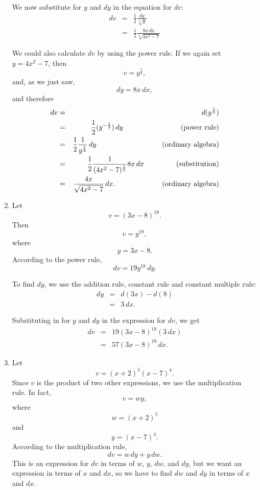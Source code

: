 \documentclass[twoside,openright]{article}
\newlength{\oldjot}
\begin{document}
\begin{enumerate}
We now substitute for $y$ and $dy$ in the equation for $dv$:
\setlength{\jot}{2ex}
\begin{eqnarray*}
dv & = & \frac{1}{2}\frac{dy}{\sqrt[2]{y}}  \\
& = &  \frac{1}{2}\frac{8x\,dx}{\sqrt[2]{4x^2-7}}  
 \end{eqnarray*}
\setlength{\jot}{\oldjot}



We could also calculate $dv$ by using the power rule.  If we again set $y= 4x^2 -7$, then
$$v  =  y^{\frac{1}{2}},$$
and, as we just saw,
$$dy = 8x\,dx,$$
and therefore
\setlength{\jot}{2ex}
\begin{eqnarray*}
dv & = & d(y^{\frac{1}{2}})  \\
 & = & \frac{1}{2}(y^{-\frac{1}{2}})\,dy  \mbox{\hspace{18ex} (power rule)}\\
 & = & \frac{1}{2}\frac{1}{y^{\frac{1}{2}}}\,dy \mbox{\hspace{20.6ex} (ordinary algebra)} \\
  & = & \frac{1}{2}\frac{1}{(4x^2 - 7)^{\frac{1}{2}}}8x\,dx \mbox{\hspace{9.7ex} (substitution)} \\
 & = & \frac{4x}{\sqrt{4x^2-7}}\,dx.  \mbox{\hspace{14.55ex} (ordinary algebra)}
 \end{eqnarray*}
 \setlength{\jot}{\oldjot}

\item \label{ex5} Let
$$v = (3x - 8)^{19}.$$
Then 
$$v = y^{19},$$
where 
$$y = 3x- 8.$$
According to the power rule,
$$dv = 19y^{18}\,dy.$$

To find $dy$, we use the addition rule, constant rule and constant multiple rule:
\begin{eqnarray*}
dy & = & d(3x) - d(8) \\
 & = & 3\,dx.
 \end{eqnarray*}


Substituting in for $y$ and $dy$ in the expression for $dv$, we get
\begin{eqnarray*}
dv & = & 19(3x-8)^{18}(3\,dx) \\
 & = & 57(3x - 8)^{18}\,dx.
\end{eqnarray*}

\item \label{ex6} Let 
$$v = (x+2)^5(x-7)^4.$$
Since $v$ is the product of two other expressions, we use the multiplication rule.  In fact, 
$$v = wy,$$
where 
$$w = (x+2)^5$$
and
$$y = (x-7)^4.$$
According to the multiplication rule,
$$dv = w\,dy + y\,dw.$$
This is an expression for $dv$ in terms of $w$, $y$, $dw$, and $dy$,
but we want an expression in terms of $x$ and $dx$, so we have to find
$dw$ and $dy$ in terms of $x$ and $dx$.


\end{enumerate}
\end{document}
